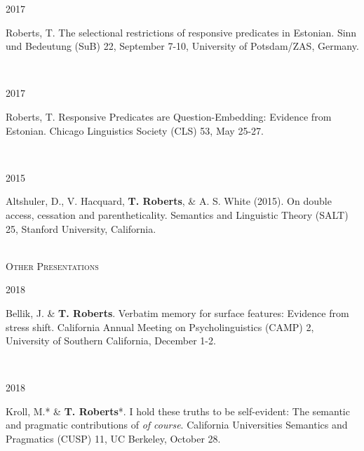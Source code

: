 \documentclass[12pt]{article} %
\begin{document}
\begin{minipage}[t]{3cm}
2017
\end{minipage}
\begin{minipage}[t]{\smallertextwidth}
Roberts, T. The selectional restrictions of responsive predicates in Estonian. Sinn und Bedeutung (SuB) 22, September 7-10, University of Potsdam/ZAS, Germany.\end{minipage}\\

\begin{minipage}[t]{3cm}
2017
\end{minipage}
\begin{minipage}[t]{\smallertextwidth}
Roberts, T. Responsive Predicates are Question-Embedding: Evidence from Estonian. Chicago Linguistics Society (CLS) 53, May 25-27.\end{minipage}\\

\begin{minipage}[t]{3cm}
2015
\end{minipage}
\begin{minipage}[t]{\smallertextwidth}
Altshuler, D., V. Hacquard, \textbf{T. Roberts}, \& A. S. White (2015). On double access, cessation and parentheticality. Semantics and Linguistic Theory (SALT) 25, Stanford University, California.\end{minipage}\\

\textsc{Other Presentations}\\

\begin{minipage}[t]{3cm}
2018
\end{minipage}
\begin{minipage}[t]{\smallertextwidth}
Bellik, J. \& \textbf{T. Roberts}. Verbatim memory for surface features: Evidence from stress shift. California Annual Meeting on Psycholinguistics (CAMP) 2, University of Southern California, December 1-2. \end{minipage}\\

\begin{minipage}[t]{3cm}
2018
\end{minipage}
\begin{minipage}[t]{\smallertextwidth}
Kroll, M.* \& \textbf{T. Roberts}*. I hold these truths to be self-evident: The semantic and pragmatic contributions of \emph{of course}. California Universities Semantics and Pragmatics (CUSP) 11, UC Berkeley, October 28. \end{minipage}\\
\end{document}
